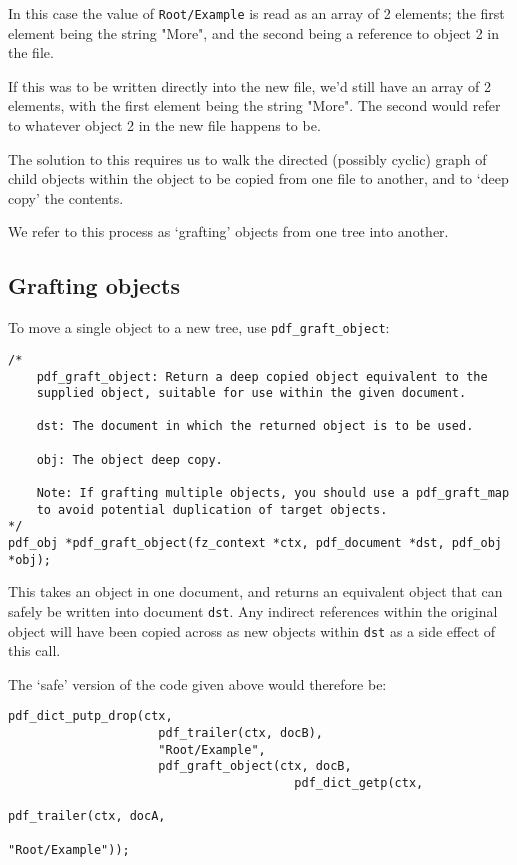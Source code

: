 \documentclass[oneside]{book}
\begin{document}
In this case the value of \texttt{Root/Example} is read as an array of 2 elements; the first element being the string "More", and the second being a reference to object 2 in the file.

If this was to be written directly into the new file, we'd still have an array of 2 elements, with the first element being the string "More". The second would refer to whatever object 2 in the new file happens to be. 

The solution to this requires us to walk the directed (possibly cyclic) graph of child objects within the object to be copied from one file to another, and to `deep copy' the contents.

We refer to this process as `grafting' objects from one tree into another.

\subsection{Grafting objects}

To move a single object to a new tree, use \texttt{pdf\_graft\_object}:

\begin{lstlisting}
/*
	pdf_graft_object: Return a deep copied object equivalent to the
	supplied object, suitable for use within the given document.

	dst: The document in which the returned object is to be used.

	obj: The object deep copy.

	Note: If grafting multiple objects, you should use a pdf_graft_map
	to avoid potential duplication of target objects.
*/
pdf_obj *pdf_graft_object(fz_context *ctx, pdf_document *dst, pdf_obj *obj);
\end{lstlisting}

This takes an object in one document, and returns an equivalent object that can safely be written into document \texttt{dst}. Any indirect references within the original object will have been copied across as new objects within \texttt{dst} as a side effect of this call.

The `safe' version of the code given above would therefore be:

\begin{lstlisting}
pdf_dict_putp_drop(ctx,
                     pdf_trailer(ctx, docB),
                     "Root/Example",
                     pdf_graft_object(ctx, docB,
                                        pdf_dict_getp(ctx,
                                                        pdf_trailer(ctx, docA,
                                                        "Root/Example")); 
\end{lstlisting}
\end{document}
